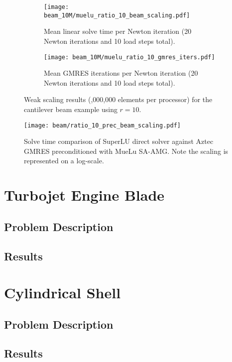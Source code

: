 \begin{figure}[ht]
    \begin{subfigure}{\columnwidth}
        \centering
        \texttt{[image: beam\_10M/muelu\_ratio\_10\_beam\_scaling.pdf]}
        \caption{Mean linear solve time per Newton iteration (20 Newton iterations and 10 load steps total).}
        \label{fig:3}
    \end{subfigure}
    \begin{subfigure}{\columnwidth}
        \centering
        \texttt{[image: beam\_10M/muelu\_ratio\_10\_gmres\_iters.pdf]}
        \caption{Mean GMRES iterations per Newton iteration (20 Newton iterations and 10 load steps total).}
        \label{fig:4}
    \end{subfigure}
    \caption{Weak scaling results (,000,000 elements per processor) for the cantilever beam example using $r = 10$.}
\end{figure}

\begin{figure}[ht]
    \centering
    \texttt{[image: beam/ratio\_10\_prec\_beam\_scaling.pdf]}
    \caption{Solve time comparison of SuperLU direct solver against Aztec GMRES preconditioned with MueLu SA-AMG. Note the scaling is represented on a log-scale.}
    \label{fig:5}
\end{figure}

\section{Turbojet Engine Blade}
\subsection{Problem Description}

\subsection{Results}

\section{Cylindrical Shell}
\subsection{Problem Description}


\subsection{Results}

%